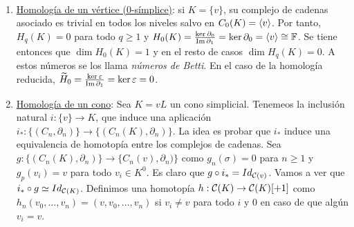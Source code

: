 \documentclass[HS.tex]{subfiles}
\begin{document}
\begin{nota}\
\begin{enumerate}
\item \underline{Homología de un vértice (0-símplice)}: si $K=\{v\}$, su complejo de cadenas asociado es trivial en todos los niveles salvo en $C_0(K)=\langle{v}\rangle$. Por tanto, $H_q(K)=0$ para todo $q\geq 1$ y $H_0(K)=\frac{\ker\partial_0}{\operatorname{Im}\partial_1}=\ker\partial_0=\langle{v}\rangle\cong\mathbb{F}$. Se tiene entonces que $\dim H_0(K)=1$ y en el resto de casos $\dim H_q(K)=0$. A estos números se los llama \emph{números de Betti}. En el caso de la homología reducida, $\widetilde{H}_0=\frac{\ker\varepsilon}{\operatorname{Im}\partial_1}=\ker\varepsilon=0$. 

\item \underline{Homología de un cono}: Sea $K=vL$ un cono simplicial. Tenemeos la inclusión natural $i:\{v\}\to K$, que induce una aplicación $i_*: \{(C_n,\partial_n)\}\to \{(C_n(K),\partial_n)\}$. La idea es probar que $i_*$ induce una equivalencia de homotopía entre los complejos de cadenas. Sea $g:\{(C_n(K),\partial_n)\}\to \{C_n(v),\partial_n)\}$ como $g_n(\sigma)=0$ para $n\geq 1$ y $g_p(v_i)=v$ para todo $v_i\in K^0$. Es claro que $g\circ i_*=Id_{\mathcal{C}(v)}$. Vamos a ver que $i_*\circ g\simeq Id_{\mathcal{C}(K)}$. Definimos una homotopía $h: \mathcal{C}(K)\to\mathcal{C}(K)[+1]$ como $h_n(v_0,\dots, v_n)=(v,v_0,\dots, v_n)$ si $v_i\neq v$ para todo $i$ y 0 en caso de que algún $v_i=v$. 
\end{enumerate}
\end{nota}
\end{document}
